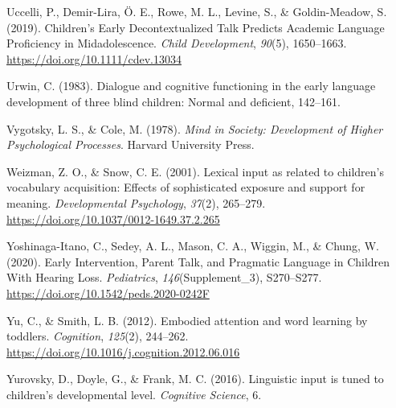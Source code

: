 \documentclass[
  man]{apa6}
\newlength{\cslhangindent}
\newlength{\cslentryspacingunit} %
\newenvironment{CSLReferences}[2] %
 {%
  \setlength{\parindent}{0pt}
  \ifodd #1
  \let\oldpar\par
  \def\par{\hangindent=\cslhangindent\oldpar}
  \fi
  \setlength{\parskip}{#2\cslentryspacingunit}
 }%
 {}
\begin{document}
\begin{CSLReferences}{1}{0}
\leavevmode{}%
Uccelli, P., Demir-Lira, Ö. E., Rowe, M. L., Levine, S., \& Goldin-Meadow, S. (2019). Children's {Early Decontextualized Talk Predicts Academic Language Proficiency} in {Midadolescence}. \emph{Child Development}, \emph{90}(5), 1650--1663. \url{https://doi.org/10.1111/cdev.13034}

\leavevmode{}%
Urwin, C. (1983). Dialogue and cognitive functioning in the early language development of three blind children: {Normal} and deficient, 142--161.

\leavevmode{}%
Vygotsky, L. S., \& Cole, M. (1978). \emph{Mind in {Society}: {Development} of {Higher Psychological Processes}}. {Harvard University Press}.

\leavevmode{}%
Weizman, Z. O., \& Snow, C. E. (2001). Lexical input as related to children's vocabulary acquisition: Effects of sophisticated exposure and support for meaning. \emph{Developmental Psychology}, \emph{37}(2), 265--279. \url{https://doi.org/10.1037/0012-1649.37.2.265}

\leavevmode{}%
Yoshinaga-Itano, C., Sedey, A. L., Mason, C. A., Wiggin, M., \& Chung, W. (2020). Early {Intervention}, {Parent Talk}, and {Pragmatic Language} in {Children With Hearing Loss}. \emph{Pediatrics}, \emph{146}(Supplement\_3), S270--S277. \url{https://doi.org/10.1542/peds.2020-0242F}

\leavevmode{}%
Yu, C., \& Smith, L. B. (2012). Embodied attention and word learning by toddlers. \emph{Cognition}, \emph{125}(2), 244--262. \url{https://doi.org/10.1016/j.cognition.2012.06.016}

\leavevmode{}%
Yurovsky, D., Doyle, G., \& Frank, M. C. (2016). Linguistic input is tuned to children's developmental level. \emph{Cognitive Science}, 6.

\end{CSLReferences}
\end{document}
